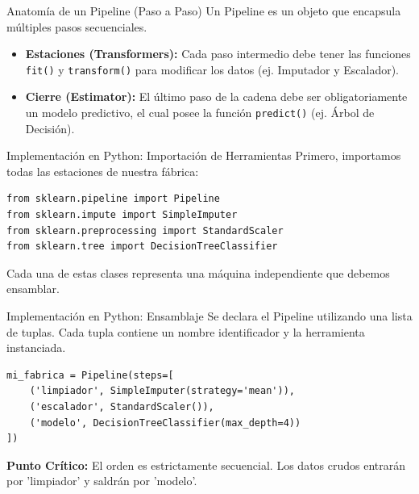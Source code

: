 \documentclass{beamer}
\begin{document}
\begin{frame}{Anatomía de un Pipeline (Paso a Paso)}
    Un Pipeline es un objeto que encapsula múltiples pasos secuenciales.
    \vspace{0.3cm}
    \begin{itemize}
        \item \textbf{Estaciones (Transformers):} Cada paso intermedio debe tener las funciones \texttt{fit()} y \texttt{transform()} para modificar los datos (ej. Imputador y Escalador).
        \item \textbf{Cierre (Estimator):} El último paso de la cadena debe ser obligatoriamente un modelo predictivo, el cual posee la función \texttt{predict()} (ej. Árbol de Decisión).
    \end{itemize}
\end{frame}

\begin{frame}[fragile]{Implementación en Python: Importación de Herramientas}
    Primero, importamos todas las estaciones de nuestra fábrica:
    \vspace{0.3cm}
    \begin{verbatim}
from sklearn.pipeline import Pipeline
from sklearn.impute import SimpleImputer
from sklearn.preprocessing import StandardScaler
from sklearn.tree import DecisionTreeClassifier
    \end{verbatim}
    \vspace{0.3cm}
    Cada una de estas clases representa una máquina independiente que debemos ensamblar.
\end{frame}

\begin{frame}[fragile]{Implementación en Python: Ensamblaje}
    Se declara el Pipeline utilizando una lista de tuplas. Cada tupla contiene un nombre identificador y la herramienta instanciada.
    \vspace{0.3cm}
    \begin{verbatim}
mi_fabrica = Pipeline(steps=[
    ('limpiador', SimpleImputer(strategy='mean')),
    ('escalador', StandardScaler()),
    ('modelo', DecisionTreeClassifier(max_depth=4))
])
    \end{verbatim}
    \vspace{0.3cm}
    \textbf{Punto Crítico:} El orden es estrictamente secuencial. Los datos crudos entrarán por 'limpiador' y saldrán por 'modelo'.
\end{frame}
\end{document}

